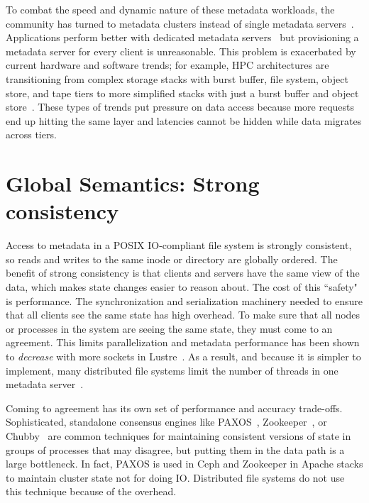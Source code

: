 To combat the speed and dynamic nature of these metadata workloads, the
community has turned to metadata clusters instead of single metadata
servers~\cite{patil:fast2011-giga+,weil:osdi2006-ceph,weil:sc2004-dyn-metadata,
sinnamohideen:atc2010-ursa, xing:sc2009-skyfs}.  Applications perform better
with dedicated metadata servers~\cite{sevilla:sc15-mantle, ren:sc2014-indexfs}
but provisioning a metadata server for every client is unreasonable. This
problem is exacerbated by current hardware and software trends; for example,
HPC architectures are transitioning from complex storage stacks with burst
buffer, file system, object store, and tape tiers to more simplified stacks
with just a burst buffer and object store~\cite{bent:login16-hpc-trends}. These
types of trends put pressure on data access because more requests end up
hitting the same layer and latencies cannot be hidden while data migrates
across tiers.

\section{Global Semantics: Strong consistency}

Access to metadata in a POSIX IO-compliant file system is strongly consistent,
so reads and writes to the same inode or directory are globally ordered.  The
benefit of strong consistency is that clients and servers have the same view of
the data, which makes state changes easier to reason about.  The cost of this
``safety" is performance.  The synchronization and serialization machinery
needed to ensure that all clients see the same state has high overhead.  To
make sure that all nodes or processes in the system are seeing the same state,
they must come to an agreement.  This limits parallelization and metadata
performance has been shown to {\it decrease} with more sockets in
Lustre~\cite{konstantinos:pdsw2014-lustre-metadata}. As a result, and because
it is simpler to implement, many distributed file systems limit the number of
threads in one metadata server~\cite{weil:osdi2006-ceph,
alam:pdsw2011-metadata-scaling, ren:sc2014-indexfs}. 

Coming to agreement has its own set of performance and accuracy trade-offs.
Sophisticated, standalone consensus engines like
PAXOS~\cite{lamport_parttime_1998}, Zookeeper~\cite{hunt_zookeeper_2010}, or
Chubby~\cite{burrows_chubby_2006} are common techniques for maintaining
consistent versions of state in groups of processes that may disagree, but
putting them in the data path is a large bottleneck. In fact, PAXOS is used in
Ceph and Zookeeper in Apache stacks to maintain cluster state not for doing IO.
Distributed file systems do not use this technique because of the overhead.

